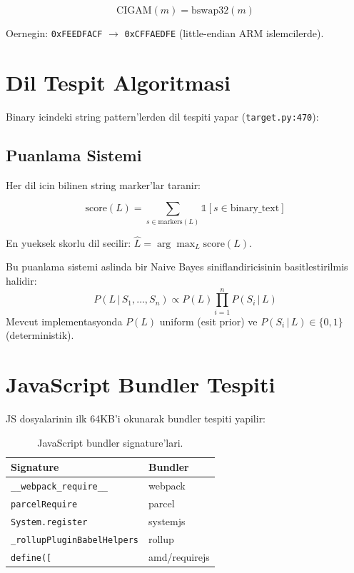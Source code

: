 \documentclass[12pt,a4paper,oneside]{book}
\theoremstyle{definition}
\newcommand{\code}[1]{\texttt{\color{green!60!white}#1}}
\newcommand{\file}[1]{\texttt{\color{yellow!70!white}#1}}
\newcommand{\prob}[1]{P\!\left(#1\right)}
\newcommand{\given}{\,|\,}
\begin{document}
\begin{equation}
\text{CIGAM}(m) = \text{bswap32}(m)
\end{equation}

Oernegin: \code{0xFEEDFACF} $\to$ \code{0xCFFAEDFE} (little-endian ARM islemcilerde).

\section{Dil Tespit Algoritmasi}
\label{sec:lang-detect}

Binary icindeki string pattern'lerden dil tespiti yapar (\file{target.py:470}):

\subsection{Puanlama Sistemi}

Her dil icin bilinen string marker'lar taranir:

\begin{equation}
\text{score}(L) = \sum_{s \in \text{markers}(L)} \mathbb{1}[s \in \text{binary\_text}]
\end{equation}

En yueksek skorlu dil secilir: $\hat{L} = \arg\max_L \text{score}(L)$.

\begin{tanim}
Bu puanlama sistemi aslinda bir Naive Bayes siniflandiricisi\-nin basitlestirilmis hali\-dir:
\begin{equation}
\prob{L \given S_1, \ldots, S_n} \propto \prob{L} \prod_{i=1}^{n} \prob{S_i \given L}
\end{equation}
Mevcut implementasyonda $\prob{L}$ uniform (esit prior) ve $\prob{S_i \given L} \in \{0, 1\}$ (deterministik).
\end{tanim}

\section{JavaScript Bundler Tespiti}
\label{sec:bundler}

JS dosyalarinin ilk 64KB'i okunarak bundler tespiti yapilir:

\begin{table}[h]
\centering
\begin{tabular}{ll}
\toprule
\textbf{\color{sectioncyan}Signature} & \textbf{\color{sectioncyan}Bundler} \\
\midrule
\code{\_\_webpack\_require\_\_} & webpack \\
\code{parcelRequire} & parcel \\
\code{System.register} & systemjs \\
\code{\_rollupPluginBabelHelpers} & rollup \\
\code{define([} & amd/requirejs \\
\bottomrule
\end{tabular}
\caption{JavaScript bundler signature'lari.}
\label{tab:bundlers}
\end{table}
\end{document}
